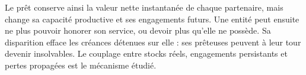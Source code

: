 Le prêt conserve ainsi la valeur nette instantanée de chaque partenaire,
mais change sa capacité productive et ses engagements futurs. Une entité
peut ensuite ne plus pouvoir honorer son service, ou devoir plus qu'elle
ne possède. Sa disparition efface les créances détenues sur elle : ses
prêteuses peuvent à leur tour devenir insolvables. Le couplage entre stocks
réels, engagements persistants et pertes propagées est le mécanisme étudié.
